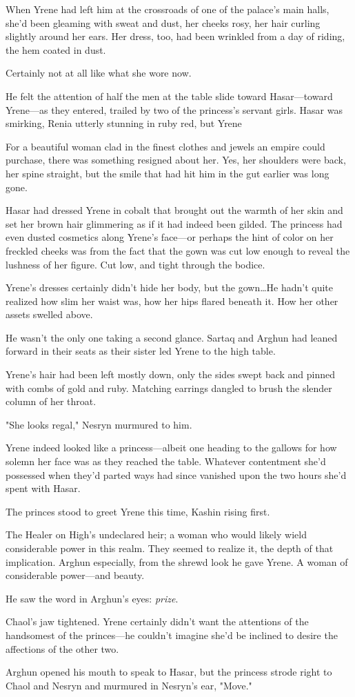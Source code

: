 When Yrene had left him at the crossroads of one of the palace's main halls, she'd been gleaming with sweat and dust, her cheeks rosy, her hair curling slightly around her ears.
Her dress, too, had been wrinkled from a day of riding, the hem coated in dust.

Certainly not at all like what she wore now.

He felt the attention of half the men at the table slide toward Hasar---toward Yrene---as they entered, trailed by two of the princess's servant girls.
Hasar was smirking, Renia utterly stunning in ruby red, but Yrene 

For a beautiful woman clad in the finest clothes and jewels an empire could purchase, there was something resigned about her.
Yes, her shoulders were back, her spine straight, but the smile that had hit him in the gut earlier was long gone.

Hasar had dressed Yrene in cobalt that brought out the warmth of her skin and set her brown hair glimmering as if it had indeed been gilded.
The princess had even dusted cosmetics along Yrene's face---or perhaps the hint of color on her freckled cheeks was from the fact that the gown was cut low enough to reveal the lushness of her figure.
Cut low, and tight through the bodice.

Yrene's dresses certainly didn't hide her body, but the gown\ldots He hadn't quite realized how slim her waist was, how her hips flared beneath it.
How her other assets swelled above.

He wasn't the only one taking a second glance.
Sartaq and Arghun had leaned forward in their seats as their sister led Yrene to the high table.

Yrene's hair had been left mostly down, only the sides swept back and pinned with combs of gold and ruby.
Matching earrings dangled to brush the slender column of her throat.

"She looks regal," Nesryn murmured to him.

Yrene indeed looked like a princess---albeit one heading to the gallows for how solemn her face was as they reached the table.
Whatever contentment she'd possessed when they'd parted ways had since vanished upon the two hours she'd spent with Hasar.

The princes stood to greet Yrene this time, Kashin rising first.

The Healer on High's undeclared heir; a woman who would likely wield considerable power in this realm.
They seemed to realize it, the depth of that implication.
Arghun especially, from the shrewd look he gave Yrene.
A woman of considerable power---and beauty.

He saw the word in Arghun's eyes: \emph{prize}.

Chaol's jaw tightened.
Yrene certainly didn't want the attentions of the handsomest of the princes---he couldn't imagine she'd be inclined to desire the affections of the other two.

Arghun opened his mouth to speak to Hasar, but the princess strode right to Chaol and Nesryn and murmured in Nesryn's ear, "Move."

